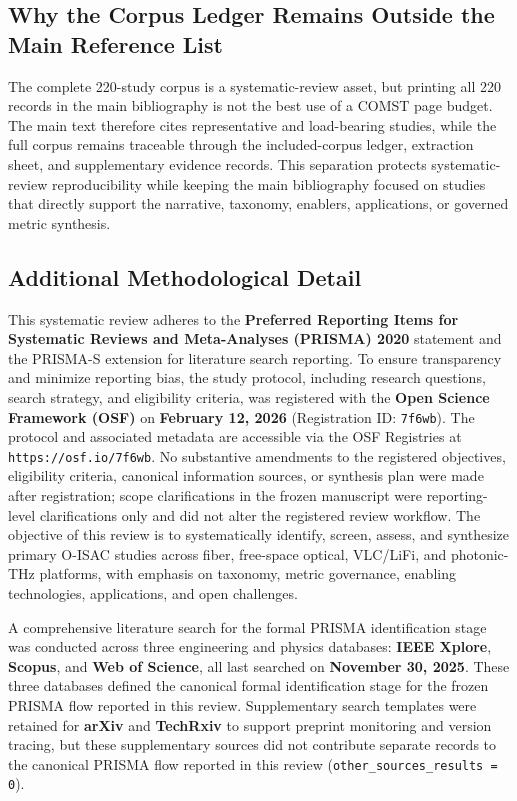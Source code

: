 \documentclass[letterpaper,journal]{IEEEtran}
\begin{document}
\subsection{Why the Corpus Ledger Remains Outside the Main Reference List}

The complete 220-study corpus is a systematic-review asset, but printing all 220 records in the main bibliography is not the best use of a COMST page budget. The main text therefore cites representative and load-bearing studies, while the full corpus remains traceable through the included-corpus ledger, extraction sheet, and supplementary evidence records. This separation protects systematic-review reproducibility while keeping the main bibliography focused on studies that directly support the narrative, taxonomy, enablers, applications, or governed metric synthesis.

\subsection{Additional Methodological Detail}

This systematic review adheres to the \textbf{Preferred Reporting Items for Systematic Reviews and Meta-Analyses (PRISMA) 2020} statement and the PRISMA-S extension for literature search reporting. To ensure transparency and minimize reporting bias, the study protocol, including research questions, search strategy, and eligibility criteria, was registered with the \textbf{Open Science Framework (OSF)} on \textbf{February 12, 2026} (Registration ID: \texttt{7f6wb}). The protocol and associated metadata are accessible via the OSF Registries at \texttt{https://osf.io/7f6wb}.
No substantive amendments to the registered objectives, eligibility criteria, canonical information sources, or synthesis plan were made after registration; scope clarifications in the frozen manuscript were reporting-level clarifications only and did not alter the registered review workflow.
The objective of this review is to systematically identify, screen, assess, and synthesize primary O-ISAC studies across fiber, free-space optical, VLC/LiFi, and photonic-THz platforms, with emphasis on taxonomy, metric governance, enabling technologies, applications, and open challenges.

A comprehensive literature search for the formal PRISMA identification stage was conducted across three engineering and physics databases: \textbf{IEEE Xplore}, \textbf{Scopus}, and \textbf{Web of Science}, all last searched on \textbf{November 30, 2025}. These three databases defined the canonical formal identification stage for the frozen PRISMA flow reported in this review. Supplementary search templates were retained for \textbf{arXiv} and \textbf{TechRxiv} to support preprint monitoring and version tracing, but these supplementary sources did not contribute separate records to the canonical PRISMA flow reported in this review (\texttt{other\_sources\_results = 0}).
\end{document}
